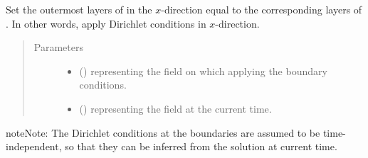 \documentclass[letterpaper,10pt,english]{sphinxmanual}
\begin{document}
\begin{fulllineitems}
\begin{fulllineitems}
\end{fulllineitems}


\begin{fulllineitems}
\label{\detokenize{api:tasmania.dycore.horizontal_boundary_relaxed.Relaxed.set_outermost_layers_x}}
Set the outermost layers of  in the \(x\)-direction equal to the corresponding
layers of . In other words, apply Dirichlet conditions in \(x\)-direction.
\begin{quote}\begin{description}
\item[{Parameters}] \leavevmode\begin{itemize}
\item {} 
 () \textendash{}  representing the field on which applying the boundary conditions.

\item {} 
 () \textendash{}  representing the field at the current time.

\end{itemize}

\end{description}\end{quote}

\begin{sphinxadmonition}{note}{Note:}
The Dirichlet conditions at the boundaries are assumed to be time-independent, so that they
can be inferred from the solution at current time.
\end{sphinxadmonition}

\end{fulllineitems}



\end{fulllineitems}
\end{document}
